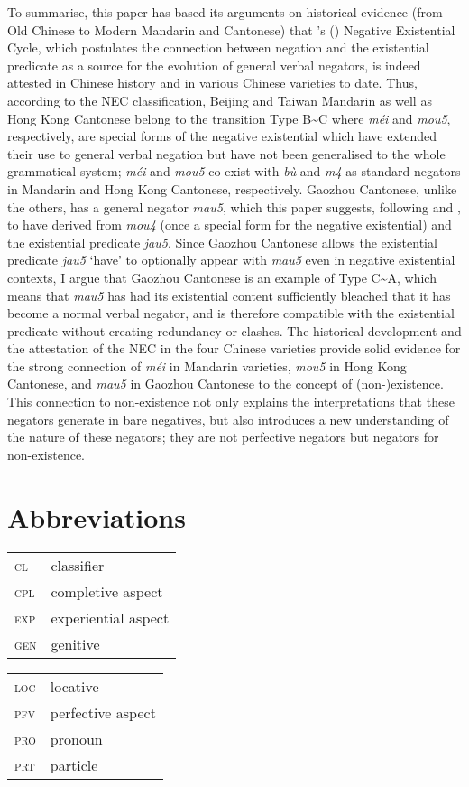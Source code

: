 \documentclass[output=paper]{langscibook}
\begin{document}
To summarise, this paper has based its arguments on historical evidence (from Old Chinese to Modern Mandarin and Cantonese) that \citeauthor{Croft1991}'s (\citeyear{Croft1991}) Negative Existential Cycle, which postulates the connection between negation and the existential predicate as a source for the evolution of general verbal negators, is indeed attested in Chinese history and in various Chinese varieties to date. Thus, according to the NEC classification, Beijing and Taiwan Mandarin as well as Hong Kong Cantonese belong to the transition Type B\sim C where \textit{méi} and \textit{mou5}, respectively, are special forms of the negative existential which have extended their use to general verbal negation but have not been generalised to the whole grammatical system; \textit{méi} and \textit{mou5} co-exist with \textit{bù} and \textit{m4} as standard negators in Mandarin and Hong Kong Cantonese, respectively. Gaozhou Cantonese, unlike the others, has a general negator \textit{mau5}, which this paper suggests, following \cite{Zhang2002} and \cite{Law2014}, to have derived from \textit{mou4} (once a special form for the negative existential) and the existential predicate \textit{jau5}. Since Gaozhou Cantonese allows the existential predicate \textit{jau5} `have' to optionally appear with \textit{mau5} even in negative existential contexts, I argue that Gaozhou Cantonese is an example of Type C\sim A, which means that \textit{mau5} has had its existential content sufficiently bleached that it has become a normal verbal negator, and is therefore compatible with the existential predicate without creating redundancy or clashes. The historical development and the attestation of the NEC in the four Chinese varieties provide solid evidence for the strong connection of \textit{méi} in Mandarin varieties, \textit{mou5} in Hong Kong Cantonese, and \textit{mau5} in Gaozhou Cantonese to the concept of (non-)existence. This connection to non-existence not only explains the interpretations that these negators generate in bare negatives, but also introduces a new understanding of the nature of these negators; they are not perfective negators but negators for non-existence. 

 
 
\section*{Abbreviations}
\begin{tabularx}{.45\textwidth}{lQ}
\textsc{cl} & classifier\\
\textsc{cpl} &	completive aspect\\
\textsc{exp} &	experiential aspect\\ 
\textsc{gen} & 	genitive\\ 
\end{tabularx}
\begin{tabularx}{.45\textwidth}{lQ}
\textsc{loc} &	locative\\
\textsc{pfv} &	perfective aspect\\ 
\textsc{pro} &	pronoun\\
\textsc{prt} & 	particle\\ 
\end{tabularx}
\end{document}
